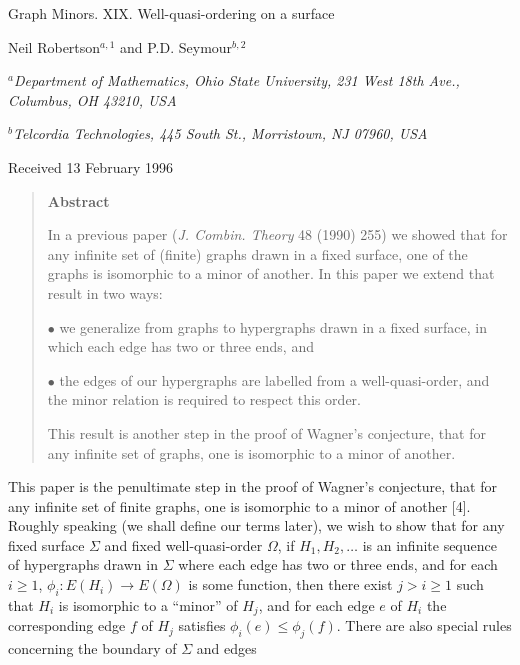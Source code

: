 {\centering
{\Large Graph Minors. XIX. Well-quasi-ordering on a surface\par}\medskip

Neil Robertson$^{a,1}$ and P.D. Seymour$^{b,2}$\par
$^a$\textit{Department of Mathematics, Ohio State University, 231 West 18th Ave., Columbus, OH 43210, USA}\par
$^b$\textit{Telcordia Technologies, 445 South St., Morristown, NJ 07960, USA}\par
Received 13 February 1996\par
}
\begin{quote}
\textbf{Abstract}

In a previous paper (\textit{J. Combin. Theory} 48 (1990) 255) we showed that for any infinite set of (finite) graphs drawn in a fixed surface, one of the graphs is isomorphic to a minor of another. In this paper we extend that result in two ways:

\hspace*{12pt}$\bullet$ we generalize from graphs to hypergraphs drawn in a fixed surface, in which each edge has two or three ends, and

\hspace*{12pt}$\bullet$ the edges of our hypergraphs are labelled from a well-quasi-order, and the minor relation is required to respect this order.

This result is another step in the proof of Wagner's conjecture, that for any infinite set of graphs, one is isomorphic to a minor of another.
\end{quote}


This paper is the penultimate step in the proof of Wagner's conjecture, that for any infinite set of finite graphs, one is isomorphic to a minor of another [4]. Roughly speaking (we shall define our terms later), we wish to show that for any fixed surface $\Sigma$ and fixed well-quasi-order $\Omega$, if $H_1, H_2, \dots$ is an infinite sequence of hypergraphs drawn in $\Sigma$ where each edge has two or three ends, and for each $i \ge 1$, $\phi_i \colon E(H_i) \to E(\Omega)$ is some function, then there exist $j > i \ge 1$ such that $H_i$ is isomorphic to a ``minor'' of $H_j$, and for each edge $e$ of $H_i$ the corresponding edge $f$ of $H_j$ satisfies $\phi_i(e) \le \phi_j(f)$. There are also special rules concerning the boundary of $\Sigma$ and edges%
%
